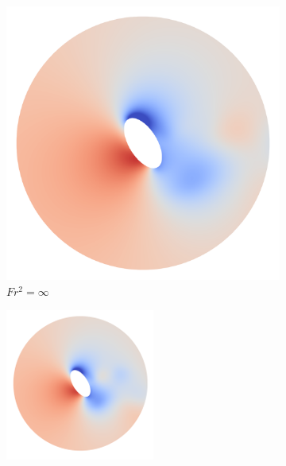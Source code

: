 \begin{figure}
    \centering
    \begin{subfigure}[b]{0.25\textwidth}
        \centering
        \includegraphics[width=\textwidth]{images/spinning_ellipse/par0p5fsinf.png}
        \caption{$Fr^2 = \infty$}
        \label{fig:par0p5fsinf}
    \end{subfigure}
    \hfill
    \begin{subfigure}[b]{0.25\textwidth}
        \centering
        \includegraphics[width=\textwidth]{images/spinning_ellipse/par0p5fs100.png}

\end{subfigure}
\end{figure}
